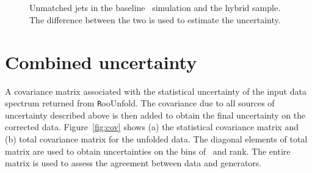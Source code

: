 \begin{figure}
~
~
\\
~
~
~
\caption{Unmatched jets in the baseline \ttbar\ simulation and the hybrid sample. The difference between the two is used to estimate the uncertainty.}
\label{fig:FalseComp}
\end{figure}

\section{Combined uncertainty}
A covariance matrix associated with the statistical uncertainty of the input data spectrum returned from {\texttt RooUnfold}. The covariance due to all sources of uncertainty described above is then added to obtain the final uncertainty on the corrected data. Figure~\ref{fig:cov}  shows (a) the statistical covariance matrix  and (b) total covariance matrix for the unfolded data. The diagonal elements of total matrix are used to obtain uncertainties on the bins of \pt\ and rank. The entire matrix is used to assess the \chisq agreement between data and generators. 

